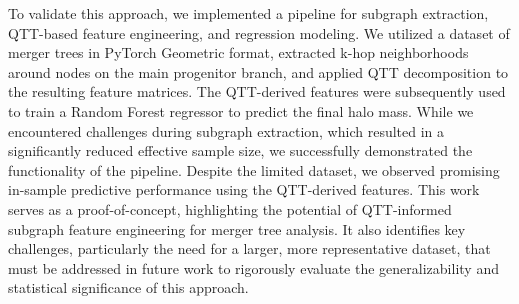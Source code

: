\documentclass[twocolumn]{aastex631}
\begin{document}
To validate this approach, we implemented a pipeline for subgraph extraction, QTT-based feature engineering, and regression modeling. We utilized a dataset of merger trees in PyTorch Geometric format, extracted k-hop neighborhoods around nodes on the main progenitor branch, and applied QTT decomposition to the resulting feature matrices. The QTT-derived features were subsequently used to train a Random Forest regressor to predict the final halo mass. While we encountered challenges during subgraph extraction, which resulted in a significantly reduced effective sample size, we successfully demonstrated the functionality of the pipeline. Despite the limited dataset, we observed promising in-sample predictive performance using the QTT-derived features. This work serves as a proof-of-concept, highlighting the potential of QTT-informed subgraph feature engineering for merger tree analysis. It also identifies key challenges, particularly the need for a larger, more representative dataset, that must be addressed in future work to rigorously evaluate the generalizability and statistical significance of this approach.
\end{document}
